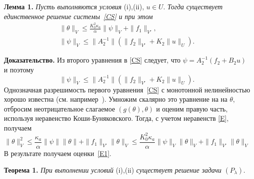 \documentclass[12pt]{article}
\begin{document}
    \textbf{Лемма 1.}
    \textit{
        Пусть выполняются условия} (i),(ii), $u\in U$. \textit{ Тогда
    существует единственное решение системы~\eqref{CS} и при этом}
    \begin{equation}
        \label{E1}
        \begin{aligned}
            \|\theta\|_V \leq
            \frac{K_0^2\kappa_a}{\alpha}\|\psi\|_V+\|f_1\|_{V'}, \\
            \|\psi\|_V\leq \|A_2^{-1}\|\left(\|f_2\|_{V'}+K_2\|u\|_U\right).
        \end{aligned}
    \end{equation}

    \textbf{ Доказательство.}
    Из второго уравнения в \eqref{CS} следует, что $\psi=A_2^{-1}(f_2+B_2u)$  и поэтому
    $$
    \|\psi\|_V\leq \|A_2^{-1}\|\left(\|f_2\|_{V'}+K_2\|u\|_U\right).
    $$
    Однозначная разрешимость первого уравнения~\eqref{CS} с монотонной нелинейностью хорошо известна (см.
    например~\cite{Kufner}). Умножим скалярно это уравнение на
    на $\theta $, отбросим неотрицательное
    слагаемое $(g(\theta),\theta)$ и оценим правую часть, используя неравенство Коши-Буняковского.
    Тогда, с учетом неравенств \eqref{E}, получаем
    \[
        \|\theta\|^2_V \leq \frac{\kappa_a}{\alpha}\|\psi\|\|\theta\|+\|f_1\|_{V'}\|\theta\|_V\leq
        \frac{K_0^2\kappa_a}{\alpha}\|\psi\|_V\|\theta\|_V+\|f_1\|_{V'}\|\theta\|_V
    \]
    В результате получаем оценки~\eqref{E1}.

    \textbf{Теорема 1.}
    \textit{
        При выполнении условий} (i),(ii)
    \textit{ существует решение задачи $(P_\lambda).$
    }
\end{document}
